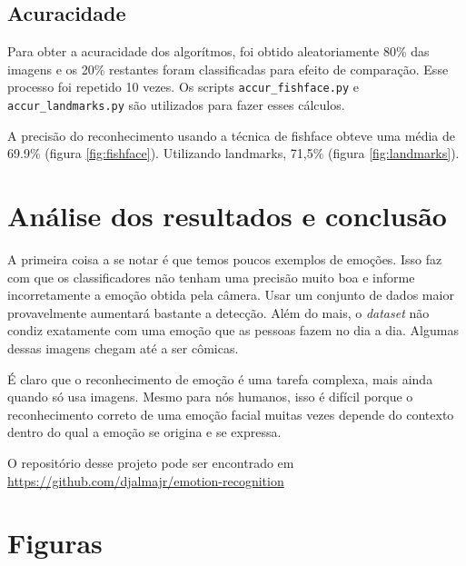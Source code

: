 \documentclass[a4paper, 12pt]{article}
\begin{document}
\subsection{Acuracidade}

Para obter a acuracidade dos algorítmos, foi obtido aleatoriamente 80\% das imagens e os 20\% restantes foram classificadas para efeito de comparação. Esse processo foi repetido 10 vezes. Os scripts \texttt{accur\_fishface.py} e \texttt{accur\_landmarks.py} são utilizados para fazer esses cálculos.

A precisão do reconhecimento usando a técnica de fishface obteve uma média de 69.9\% (figura \ref{fig:fishface}). Utilizando landmarks, 71,5\% (figura \ref{fig:landmarks}).

\section{Análise dos resultados e conclusão}

A primeira coisa a se notar é que temos poucos exemplos de emoções. Isso faz com que os classificadores não tenham uma precisão muito boa e informe incorretamente a emoção obtida pela câmera. Usar um conjunto de dados maior provavelmente aumentará bastante a detecção. Além do mais, o \textit{dataset} não condiz exatamente com uma emoção que as pessoas fazem no dia a dia. Algumas dessas imagens chegam até a ser cômicas.

É claro que o reconhecimento de emoção é uma tarefa complexa, mais ainda quando só usa imagens. Mesmo para nós humanos, isso é difícil porque o reconhecimento correto de uma emoção facial muitas vezes depende do contexto dentro do qual a emoção se origina e se expressa.

O repositório desse projeto pode ser encontrado em \url{https://github.com/djalmajr/emotion-recognition}

\clearpage
\newpage
\section{Figuras}
\end{document}
